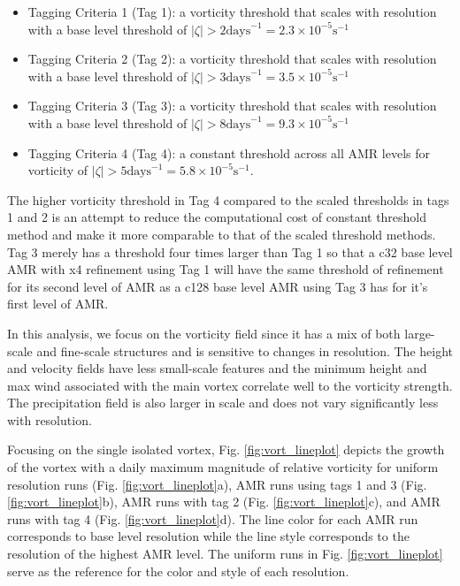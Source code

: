 \begin{itemize}
    \item
        Tagging Criteria 1 (Tag 1): a vorticity threshold that scales with resolution 
        with a base level threshold of 
        $|\zeta| > 2 \mathrm{days}^{-1} = 2.3 \times 10^{-5} \mathrm{s}^{-1}$
     \item
        Tagging Criteria 2 (Tag 2): a vorticity threshold that scales with resolution 
        with a base level threshold of 
        $|\zeta| > 3 \mathrm{days}^{-1} = 3.5 \times 10^{-5} \mathrm{s}^{-1}$
     \item
        Tagging Criteria 3 (Tag 3): a vorticity threshold that scales with resolution 
        with a base level threshold of 
        $|\zeta| > 8 \mathrm{days}^{-1} = 9.3 \times 10^{-5} \mathrm{s}^{-1}$
     \item
        Tagging Criteria 4 (Tag 4): a constant threshold across all AMR levels for vorticity of 
        $|\zeta| > 5 \mathrm{days}^{-1} = 5.8 \times 10^{-5} \mathrm{s}^{-1}$.
\end{itemize}
The higher vorticity threshold in Tag 4 compared to the scaled thresholds in 
tags 1 and 2 is an attempt to reduce the computational cost of constant threshold
method and make it more comparable to that of the scaled threshold methods. Tag 3 merely
has a threshold four times larger than Tag 1 so that a c32 base level AMR with x4 refinement
using Tag 1 will have the same threshold of refinement for its second level of AMR as a c128 base level
AMR using Tag 3 has for it's first level of AMR.

In this analysis, we focus on the vorticity field since it has a mix of both large-scale 
and fine-scale structures and is sensitive to changes in resolution. The height and
velocity fields have less small-scale features and the minimum height and max wind
associated with the main vortex correlate well to the vorticity strength. The precipitation
field is also larger in scale and does not vary significantly less with resolution.

Focusing on the single isolated vortex, Fig. \ref{fig:vort_lineplot} depicts the growth of the vortex with a daily
maximum magnitude of relative vorticity for uniform resolution runs (Fig.
\ref{fig:vort_lineplot}a), AMR runs using tags 1 and 3 (Fig. \ref{fig:vort_lineplot}b), AMR runs 
with tag 2 (Fig. \ref{fig:vort_lineplot}c), and AMR runs with tag 4 (Fig. \ref{fig:vort_lineplot}d).
The line color for each AMR run corresponds to base level resolution while the line style corresponds
to the resolution of the highest AMR level. The uniform runs in Fig. \ref{fig:vort_lineplot} serve as the
reference for the color and style of each resolution. 

